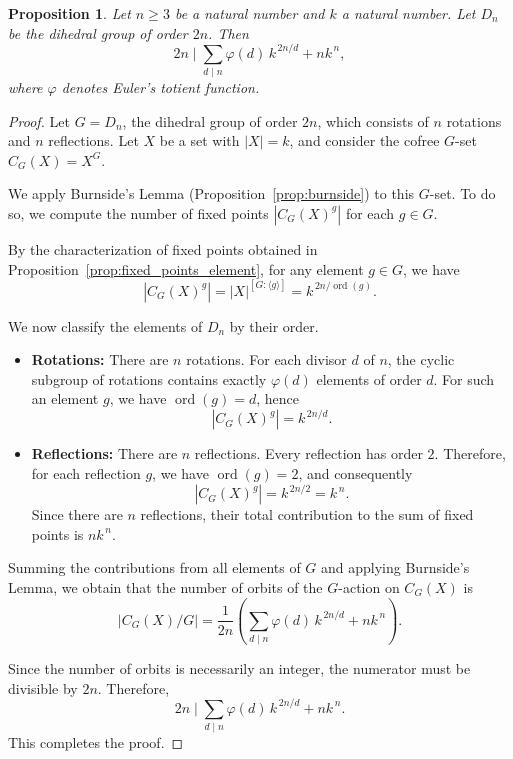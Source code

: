 \documentclass{amsart}
\newtheorem{proposition}{Proposition}
\begin{document}
\begin{proposition}\label{prop:dihedral_congruence}
Let $n \ge 3$ be a natural number and $k$ a natural number. Let $D_n$ be the dihedral group of order $2n$. Then
\[
2n \mid \sum_{d \mid n} \varphi(d)\, k^{\,2n/d} + n k^{\,n},
\]
where $\varphi$ denotes Euler's totient function.
\end{proposition}

\begin{proof}
Let $G = D_n$, the dihedral group of order $2n$, which consists of $n$ rotations and $n$ reflections. Let $X$ be a set with $|X| = k$, and consider the cofree $G$-set $C_G(X) = X^G$.

We apply Burnside's Lemma (Proposition~\ref{prop:burnside}) to this $G$-set. To do so, we compute the number of fixed points $|C_G(X)^g|$ for each $g \in G$.

By the characterization of fixed points obtained in Proposition~\ref{prop:fixed_points_element}, for any element $g \in G$, we have
\[
\left\lvert C_G(X)^g \right\rvert = |X|^{[G : \langle g \rangle]} = k^{\, 2n / \operatorname{ord}(g)}.
\]

We now classify the elements of $D_n$ by their order.

\begin{itemize}
\item \textbf{Rotations:} There are $n$ rotations. For each divisor $d$ of $n$, the cyclic subgroup of rotations contains exactly $\varphi(d)$ elements of order $d$. For such an element $g$, we have $\operatorname{ord}(g) = d$, hence
\[
\left\lvert C_G(X)^g \right\rvert = k^{\, 2n / d}.
\]

\item \textbf{Reflections:} There are $n$ reflections. Every reflection has order $2$. Therefore, for each reflection $g$, we have $\operatorname{ord}(g) = 2$, and consequently
\[
\left\lvert C_G(X)^g \right\rvert = k^{\, 2n / 2} = k^{\, n}.
\]
Since there are $n$ reflections, their total contribution to the sum of fixed points is $n k^{\, n}$.
\end{itemize}

Summing the contributions from all elements of $G$ and applying Burnside's Lemma, we obtain that the number of orbits of the $G$-action on $C_G(X)$ is
\[
\left\lvert C_G(X) / G \right\rvert
= \frac{1}{2n}
\left( \sum_{d \mid n} \varphi(d)\, k^{\, 2n/d} + n k^{\, n} \right).
\]

Since the number of orbits is necessarily an integer, the numerator must be divisible by $2n$. Therefore,
\[
2n \mid \sum_{d \mid n} \varphi(d)\, k^{\, 2n/d} + n k^{\, n}.
\]
This completes the proof.
\end{proof}
\end{document}

